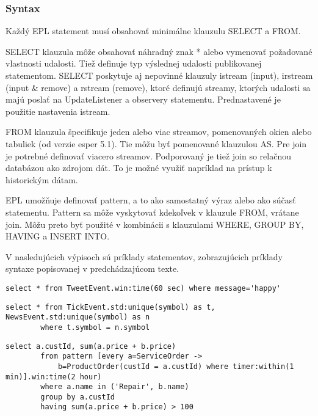 		\subsubsection{Syntax}
		Každý EPL statement musí obsahovať minimálne klauzulu SELECT a FROM.

		SELECT klauzula môže obsahovať náhradný znak * alebo vymenovať požadované vlastnosti udalosti. Tiež definuje typ výslednej udalosti publikovanej statementom. SELECT poskytuje aj nepovinné klauzuly istream (input), irstream (input \& remove) a rstream (remove), ktoré definujú streamy, ktorých udalosti sa majú poslať na UpdateListener a observery statementu. Prednastavené je použitie nastavenia istream.
		
		FROM klauzula špecifikuje jeden alebo viac streamov, pomenovaných okien alebo tabuliek (od verzie esper 5.1). Tie môžu byť pomenované klauzulou AS. Pre join je potrebné definovať viacero streamov. Podporovaný je tiež join so relačnou databázou ako zdrojom dát. To je možné využiť napríklad na prístup k historickým dátam.

		EPL umožňuje definovať pattern, a to ako samostatný výraz alebo ako súčasť statementu. Pattern sa môže vyskytovať kdekoľvek v klauzule FROM, vrátane join. Môžu preto byť použité v kombinácii s klauzulami WHERE, GROUP BY, HAVING a INSERT INTO.
		

		V nasledujúcich výpisoch sú príklady statementov, zobrazujúcich príklady syntaxe popisovanej v predchádzajúcom texte.
				
		\begin{lstlisting}[label=lst:epl-simple,caption=Jednoduchý EPL statement]
		select * from TweetEvent.win:time(60 sec) where message='happy'
		\end{lstlisting}
		
		\begin{lstlisting}[label=lst:epl-join,caption=Jednoduchý EPL statements použitím join]
		select * from TickEvent.std:unique(symbol) as t, NewsEvent.std:unique(symbol) as n
		where t.symbol = n.symbol
		\end{lstlisting}
		
		\begin{lstlisting}[label=lst:epl-pattern,caption=EPL statement s použitím patternu]
		select a.custId, sum(a.price + b.price)
		from pattern [every a=ServiceOrder -> 
			b=ProductOrder(custId = a.custId) where timer:within(1 min)].win:time(2 hour) 
		where a.name in ('Repair', b.name)
		group by a.custId
		having sum(a.price + b.price) > 100
		\end{lstlisting}
				
